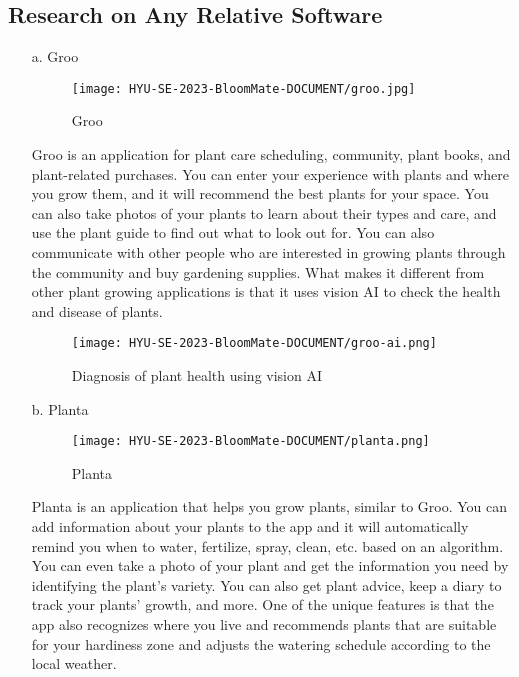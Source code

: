 \documentclass[conference, a4paper]{IEEEtran}
\begin{document}
\subsection{Research on Any Relative Software}
\begin{enumerate}
    \item[a.]Groo
    
\begin{figure}[h]
\texttt{[image: HYU-SE-2023-BloomMate-DOCUMENT/groo.jpg]}
\label{fig:Groo}
\caption{Groo} 
\end{figure}

    \item[]Groo is an application for plant care scheduling, community, plant books, and plant-related purchases. You can enter your experience with plants and where you grow them, and it will recommend the best plants for your space. You can also take photos of your plants to learn about their types and care, and use the plant guide to find out what to look out for. You can also communicate with other people who are interested in growing plants through the community and buy gardening supplies. What makes it different from other plant growing applications is that it uses vision AI to check the health and disease of plants.
    
\begin{figure}[h]
\texttt{[image: HYU-SE-2023-BloomMate-DOCUMENT/groo-ai.png]}
\label{fig:GrooAI}
\caption{Diagnosis of plant health using vision AI} 
\end{figure}
\newpage

\item[b.]Planta

\begin{figure}[h]
\texttt{[image: HYU-SE-2023-BloomMate-DOCUMENT/planta.png]}
\label{fig:Planta}
\caption{Planta} 
\end{figure}

\item[]Planta is an application that helps you grow plants, similar to Groo. You can add information about your plants to the app and it will automatically remind you when to water, fertilize, spray, clean, etc. based on an algorithm. You can even take a photo of your plant and get the information you need by identifying the plant's variety. You can also get plant advice, keep a diary to track your plants' growth, and more. One of the unique features is that the app also recognizes where you live and recommends plants that are suitable for your hardiness zone and adjusts the watering schedule according to the local weather.\\


\end{enumerate}
\end{document}
